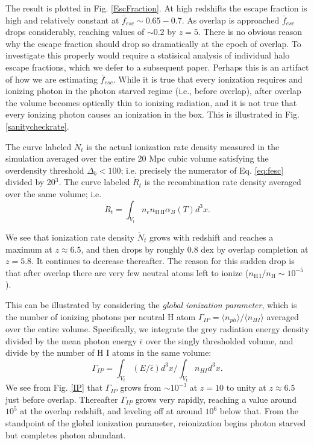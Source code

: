 The result is plotted in Fig. \ref{EscFraction}.  At high redshifts the escape fraction is high and relatively constant at $\bar{f}_{esc} \sim 0.65-0.7$. As overlap is approached $\bar{f}_{esc}$ drops considerably, reaching values of $\sim 0.2$ by $z=5.$ There is no obvious reason why the escape fraction should drop so dramatically at the epoch of overlap. To investigate this properly would require a statisical analysis of individual halo escape fractions, which we defer to a subsequent paper. Perhaps this is an artifact of how we are estimating $\bar{f}_{esc}$. While it is true that every ionization requires and ionizing photon in the photon starved regime (i.e., before overlap), after overlap the volume becomes optically thin to ionizing radiation, and it is not true that every ionizing photon causes an ionization in the box. This is illustrated in Fig. \ref{sanitycheckrate}. 

The curve labeled $\dot{N}_t$ is the actual ionization rate density measured in the simulation averaged over the entire 20 Mpc cubic volume satisfying the overdensity threshold $\Delta_b < 100$; i.e. precisely the numerator of Eq. \eqref{eq:fesc} divided by 20$^3$. The curve labeled $\dot{R}_t$ is the recombination rate density averaged over the same volume; i.e.
\begin{equation}
\dot{R}_t = \int_{V_t}  n_e n_\mathrm{H\,II}\alpha_B(T) d^3x  .
\label{eq:totrecombst}
\end{equation}

We see that ionization rate density $\dot{N}_t$ grows with redshift and reaches a maximum at $z \approx 6.5$, and then drops by roughly 0.8 dex by overlap completion at $z=5.8$. It continues to decrease thereafter. The reason for this sudden drop is that after overlap there are very few neutral atoms left to ionize ($n_\mathrm{H\,I}/n_\mathrm{H} \sim 10^{-5}$).  

This can be illustrated by considering the {\em global ionization parameter}, which is the number of ionizing photons per neutral H atom $\Gamma_{IP} = \langle n_{ph}\rangle/\langle n_{H I} \rangle$ averaged over the entire volume. Specifically, we integrate the grey radiation energy density divided by the mean photon energy $\bar{\epsilon}$ over the singly thresholded volume, and divide by the number of H {\footnotesize I} atoms in the same volume:
\begin{equation}
\Gamma_{IP} =  \int_{V_t}  (E/\bar{\epsilon}) d^3x \bigg / \int_{V_t}  n_{HI} d^3x. 
\label{eq:IP}
\end{equation}
We see from Fig. \ref{IP} that $\Gamma_{IP}$ grows from $\sim 10^{-3}$ at $z=10$ to unity at $z\approx 6.5$ just before overlap. Thereafter $\Gamma_{IP}$ grows very rapidly, reaching a value around $10^5$ at the overlap redshift, and leveling off at around $10^6$ below that.  From the standpoint of the global ionization parameter, reionization begins photon starved but completes photon abundant. 
  
